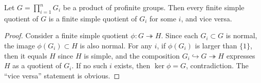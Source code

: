 	\begin{lemma} \label{lemma:product-quotient}
		Let $G = \prod_{i=1}^n G_i$ be a product of profinite groups. Then every finite simple quotient of $G$ is a finite simple quotient of $G_i$ for some $i$, and vice versa.
	\end{lemma}
	\begin{proof}
		Consider a finite simple quotient $\phi: G \twoheadrightarrow H$. Since each $G_i \subset G$ is normal, the image $\phi(G_i) \subset H$ is also normal. For any $i$, if $\phi(G_i)$ is larger than $\{1\}$, then it equals $H$ since $H$ is simple, and the composition
		\(
			G_i \hookrightarrow G \twoheadrightarrow H
		\)
		expresses $H$ as a quotient of $G_i$. If no such $i$ exists, then $\ker \phi = G$, contradiction. The ``vice versa'' statement is obvious.
	\end{proof}
	
